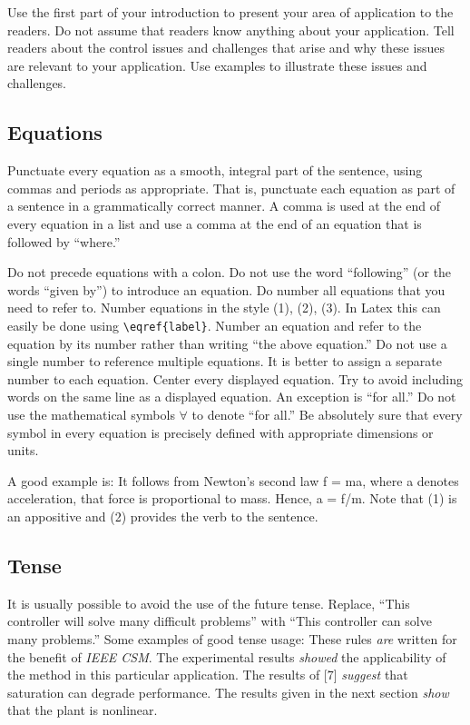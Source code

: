 Use the first part of your introduction to present your area of application to the readers.  Do not assume that readers know anything about your application.  Tell readers about the control issues and challenges that arise and why these issues are relevant to your application.  Use examples to illustrate these issues and challenges.

\subsection{Equations}
Punctuate every equation as a smooth, integral part of the sentence, using commas and periods as appropriate. That is, punctuate each equation as part of a sentence in a grammatically correct manner.  A comma is used at the end of every equation in a list and use a comma at the end of an equation that is followed by ``where.''   

Do not precede equations with a colon. Do not use the word ``following'' (or the words ``given by'') to introduce an equation.  
Do number all equations that you need to refer to.  Number equations in the style (1), (2), (3). In Latex this can easily be done using \verb!\eqref{label}!.  Number an equation and refer to the equation by its number rather than writing ``the above equation.''  Do not use a single number to reference multiple equations.  It is better to assign a separate number to each equation.
%
Center every displayed equation. Try to avoid including words on the same line as a displayed equation.  
An exception is ``for all.''  Do not use the mathematical symbols $\forall$ to denote ``for all.''
%
Be absolutely sure that every symbol in every equation is precisely defined with appropriate dimensions or units.

A good example is:  It follows from Newton’s second law
\be
			f = ma,					
\ee
where a denotes acceleration, that force is proportional to mass.  Hence,
\be
			a = f/m.				
\ee
Note that (1) is an appositive and (2) provides the verb to the sentence.


\subsection{Tense}
It is usually possible to avoid the use of the future tense.  Replace, ``This controller will solve many difficult problems'' with ``This controller can solve many problems.'' Some examples of good tense usage: These rules \textit{are} written for the benefit of \textit{IEEE CSM}.  The experimental results \textit{showed} the applicability of the method in this particular application.  The results of [7] \textit{suggest} that saturation can degrade performance.  The results given in the next section \textit{show} that the plant is nonlinear. 

